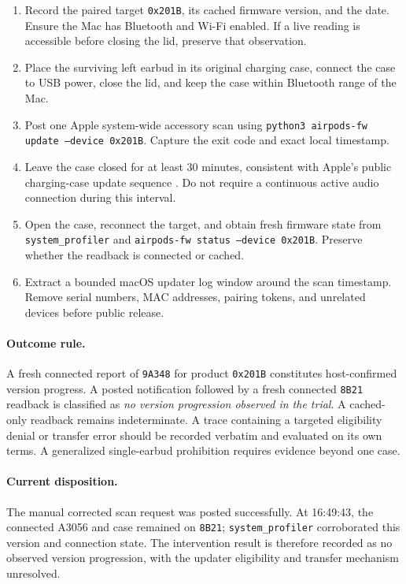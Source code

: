 \documentclass[11pt,letterpaper]{article}
\begin{document}
\begin{enumerate}[leftmargin=2em]
\item Record the paired target \texttt{0x201B}, its cached firmware version, and the date. Ensure the Mac has Bluetooth and Wi-Fi enabled. If a live reading is accessible before closing the lid, preserve that observation.
\item Place the surviving left earbud in its original charging case, connect the case to USB power, close the lid, and keep the case within Bluetooth range of the Mac.
\item Post one Apple system-wide accessory scan using \texttt{python3 airpods-fw update --device 0x201B}. Capture the exit code and exact local timestamp.
\item Leave the case closed for at least 30 minutes, consistent with Apple's public charging-case update sequence \cite{applefw}. Do not require a continuous active audio connection during this interval.
\item Open the case, reconnect the target, and obtain fresh firmware state from \texttt{system\_profiler} and \texttt{airpods-fw status --device 0x201B}. Preserve whether the readback is connected or cached.
\item Extract a bounded macOS updater log window around the scan timestamp. Remove serial numbers, MAC addresses, pairing tokens, and unrelated devices before public release.
\end{enumerate}

\paragraph{Outcome rule.} A fresh connected report of \texttt{9A348} for product \texttt{0x201B} constitutes host-confirmed version progress. A posted notification followed by a fresh connected \texttt{8B21} readback is classified as \emph{no version progression observed in the trial}. A cached-only readback remains indeterminate. A trace containing a targeted eligibility denial or transfer error should be recorded verbatim and evaluated on its own terms. A generalized single-earbud prohibition requires evidence beyond one case.

\paragraph{Current disposition.} The manual corrected scan request was posted successfully. At 16:49:43, the connected A3056 and case remained on \texttt{8B21}; \texttt{system\_profiler} corroborated this version and connection state. The intervention result is therefore recorded as no observed version progression, with the updater eligibility and transfer mechanism unresolved.
\end{document}
